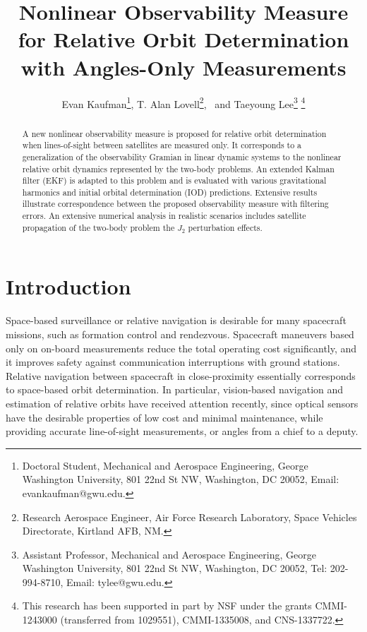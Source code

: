 \documentclass[letterpaper, paper,10pt]{AAS}		%
\begin{document}
\title{Nonlinear Observability Measure for Relative Orbit Determination with Angles-Only Measurements}

\author{Evan Kaufman\thanks{Doctoral Student, Mechanical and Aerospace Engineering, George Washington University, 801 22nd St NW, Washington, DC 20052, Email: evankaufman@gwu.edu.},  
T. Alan Lovell\thanks{Research Aerospace Engineer, Air Force Research Laboratory, Space Vehicles Directorate, Kirtland AFB, NM.},
\ and Taeyoung Lee\thanks{Assistant Professor, Mechanical and Aerospace Engineering, George Washington University, 801 22nd St NW, Washington, DC 20052, Tel: 202-994-8710, Email: tylee@gwu.edu.}
\thanks{This research has been supported in part by NSF under the grants CMMI-1243000 (transferred from 1029551), CMMI-1335008, and CNS-1337722.}
}


\maketitle{} 		


\begin{abstract}
A new nonlinear observability measure is proposed for relative orbit determination when lines-of-sight between satellites are measured only. It corresponds to a generalization of the observability Gramian in linear dynamic systems to the nonlinear relative orbit dynamics represented by the two-body problems. An extended Kalman filter (EKF) is adapted to this problem and is evaluated with various gravitational harmonics and initial orbital determination (IOD) predictions. Extensive results illustrate correspondence between the proposed observability measure with filtering errors. An extensive numerical analysis in realistic scenarios includes satellite propagation of the two-body problem the $J_2$ perturbation effects.
\end{abstract}


\section{Introduction}

Space-based surveillance or relative navigation is desirable for many spacecraft missions, such as formation control and rendezvous. Spacecraft maneuvers based only on on-board measurements reduce the total operating cost significantly, and it improves safety against communication interruptions with ground stations.  Relative navigation between spacecraft in close-proximity essentially corresponds to space-based orbit determination.  In particular, vision-based navigation and estimation of relative orbits have received attention recently, since optical sensors have the desirable properties of low cost and minimal maintenance, while providing accurate line-of-sight measurements, or angles from a chief to a deputy.
\end{document}

